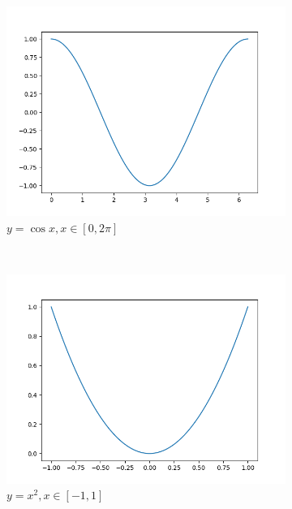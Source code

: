 \begin{figure}
\begin{subfigure}{0.3\linewidth}
        \includegraphics[width=\linewidth]{../figures/cos.png}
        \caption{\(y=\cos x, x\in[0,2\pi]\)}
    \end{subfigure}
    \\
    \hspace{0.02\linewidth}
    \begin{subfigure}{0.3\linewidth}
        \includegraphics[width=\linewidth]{../figures/square.png}
        \caption{\(y=x^2, x\in[-1,1]\)}
    \end{subfigure}
    \hspace{0.02\linewidth}
    \begin{subfigure}{0.3\linewidth}

\end{subfigure}
\end{figure}
